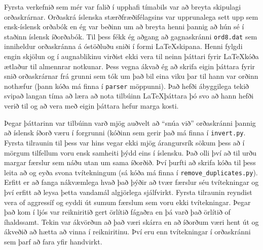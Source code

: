 \documentclass[]{article}
\begin{document}
Fyrsta verkefnið sem mér var falið í upphafi tímabils var að breyta skipulagi orðaskrárnar. Orðaskrá íslenska stærðfræðifélagsins var upprunalega sett upp sem ensk-íslensk orðabók en ég var beðinn um að breyta henni þannig að hún sé í staðinn íslensk íðorðabók. Til þess fékk ég aðgang að gagnaskránni \texttt{ord8.dat} sem inniheldur orðaskránna á óstöðluðu sniði í formi \LaTeX skipana. Henni fylgdi engin skjölun og í augnablikinu virðist ekki vera til neinn þáttari fyrir \LaTeX kóða ætlaður til almennrar notkunar. Þess vegna ákvað ég að skrifa eigin þáttara fyrir snið orðaskrárnar frá grunni sem tók um það bil eina viku þar til hann var orðinn nothæfur (þann kóða má finna í \texttt{parser} möppunni). Það hefði ábyggilega tekið svipað langan tíma að læra að nota tilbúinn \LaTeX þáttara þó svo að hann hefði verið til og að vera með eigin þáttara hefur marga kosti. 

Þegar þáttarinn var tilbúinn varð mjög auðvelt að ``snúa við'' orðaskránni þannig að íslensk íðorð væru í forgrunni (kóðinn sem gerir það má finna í \texttt{invert.py}. Fyrsta tilraunin til þess var hins vegar ekki mjög árangursrík sökum þess að í mörgum tilfellum voru ensk samheiti þýdd eins í íslensku. Það olli því að til urðu margar færslur sem náðu utan um sama íðorðið. Því þurfti að skrifa kóða til þess leita að og eyða svona tvítekningum (sá kóða má finna í \texttt{remove\_duplicates.py}). Erfitt er að fanga nákvæmlega hvað það þýðir að tvær færslur séu tvítekningar og því erfitt að leysa þetta vandamál algjörlega sjálfvirkt. Fyrsta tilraunin reyndist vera of aggressíf og eyddi út sumum færslum sem voru ekki tvítekningar. Þegar það kom í ljós var reikniritið gert örlítið fágaðra en þá varð það örlítið of íhaldssamt. Tekin var ákvörðun að það væri skárra en að íðorðum væri hent út og ákveðið að hætta að vinna í reikniritinu. Því eru enn tvítekningar í orðaskránni sem þarf að fara yfir handvirkt. 
\end{document}
